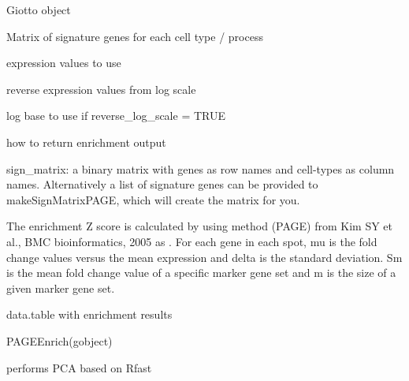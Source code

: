 \documentclass[a4paper]{book}
\begin{document}
%
\begin{Arguments}
\begin{ldescription}
\item[\code{gobject}] Giotto object

\item[\code{sign\_matrix}] Matrix of signature genes for each cell type / process

\item[\code{expression\_values}] expression values to use

\item[\code{reverse\_log\_scale}] reverse expression values from log scale

\item[\code{logbase}] log base to use if reverse\_log\_scale = TRUE

\item[\code{output\_enrichment}] how to return enrichment output
\end{ldescription}
\end{Arguments}
%
\begin{Details}\relax
sign\_matrix: a binary matrix with genes as row names and cell-types as column names.
Alternatively a list of signature genes can be provided to makeSignMatrixPAGE, which will create
the matrix for you. \\{}

The enrichment Z score is calculated by using method (PAGE) from
Kim SY et al., BMC bioinformatics, 2005 as .
For each gene in each spot, mu is the fold change values versus the mean expression
and delta is the standard deviation. Sm is the mean fold change value of a specific marker gene set
and  m is the size of a given marker gene set.
\end{Details}
%
\begin{Value}
data.table with enrichment results
\end{Value}
%
\begin{SeeAlso}\relax
{}
\end{SeeAlso}
%
\begin{Examples}
\begin{ExampleCode}
    PAGEEnrich(gobject)
\end{ExampleCode}
\end{Examples}
%
\begin{Description}\relax
performs PCA based on Rfast
\end{Description}
\end{document}

